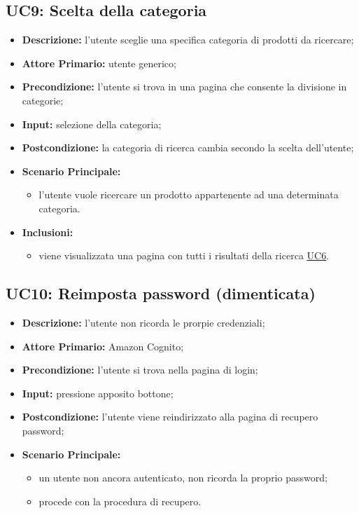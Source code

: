         \subsection{UC9: Scelta della categoria}
        \label{sec:UC9}
        \begin{itemize}
            \item \textbf{Descrizione:} l'utente sceglie una specifica categoria di prodotti da ricercare;
            \item \textbf{Attore Primario:} utente generico;
            \item \textbf{Precondizione:} l'utente si trova in una pagina che consente la divisione in categorie;
            \item \textbf{Input:} selezione della categoria;
            \item \textbf{Postcondizione:} la categoria di ricerca cambia secondo la scelta dell'utente;
            \item \textbf{Scenario Principale:}
            \begin{itemize}
                \item l'utente vuole ricercare un prodotto appartenente ad una determinata categoria.
            \end{itemize} 
            \item \textbf{Inclusioni:}
            \begin{itemize}
                \item viene visualizzata una pagina con tutti i risultati della ricerca \hyperref[sec:UC6]{\underline{UC6}}.
            \end{itemize}
        \end{itemize}
        \subsection{UC10: Reimposta password (dimenticata)}
        \label{sec:UC10}
        \begin{itemize}
            \item \textbf{Descrizione:} l'utente non ricorda le prorpie credenziali;
            \item \textbf{Attore Primario:} Amazon Cognito;
            \item \textbf{Precondizione:} l'utente si trova nella pagina di login;
            \item \textbf{Input:} pressione apposito bottone;
            \item \textbf{Postcondizione:} l'utente viene reindirizzato alla pagina di recupero password;
            \item \textbf{Scenario Principale:}
            \begin{itemize}
                \item un utente non ancora autenticato, non ricorda la proprio password;
                \item procede con la procedura di recupero.
            \end{itemize}
        \end{itemize}
